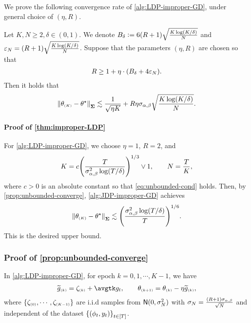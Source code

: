 We prove the following convergence rate of \cref{alg:LDP-improper-GD}, under general choice of $(\eta,R)$.
\begin{proposition}\label{prop:unbounded-converge}
Let $K,N\geq 2, \delta\in(0,1)$. We denote $B_\delta\mathrel{\mathop:}= 6(R+1)\sqrt{\frac{K\log(K/\delta)}{N}}$ and $\varepsilon_N=(R+1)\sqrt{\frac{K\log(K/\delta)}{N}}$. Suppose that the parameters $(\eta, R)$ are chosen so that
\begin{align}\label{eq:unbounded-cond}
    R\geq 1+\eta\cdot {\left(  B_\delta+4\varepsilon_N\right)}.
\end{align}
Then it holds that \whp
\begin{align*}
    \left\|\theta_{\scriptscriptstyle{ (K) }}-\theta^\star\right\|_{\boldsymbol{\Sigma}}\lesssim \frac{1}{\sqrt{\eta K}}+R\eta\sigma_{\alpha,\beta} \sqrt{\frac{K\log(K/\delta)}{N}}.
\end{align*}
\end{proposition}

\paragraph{Proof of \cref{thm:improper-LDP}}
For \cref{alg:LDP-improper-GD}, we choose $\eta=1$, $R=2$, and
\begin{align*}
    K=c{\left( \frac{T}{\sigma_{\alpha,\beta}^2 \log (T/\delta)} \right)}^{1/3}\vee 1, \qquad
    N=\frac{T}{K}, 
\end{align*}
where $c>0$ is an absolute constant so that \eqref{eq:unbounded-cond} holds. Then, by \cref{prop:unbounded-converge}, \cref{alg:JDP-improper-GD} achieves
\begin{align*}
    \left\|\theta_{\scriptscriptstyle{ (K) }}-\theta^\star\right\|_{\boldsymbol{\Sigma}}\lesssim {\left( \frac{\sigma_{\alpha,\beta}^2\log(T/\delta)}{T} \right)}^{1/6}.
\end{align*}
This is the desired upper bound.

\subsubsection{Proof of \cref{prop:unbounded-converge}}

In \cref{alg:LDP-improper-GD}, for epoch $k=0,1,\cdots,K-1$, we have
\begin{align*}
    \til g\kk=\zeta\kk+\avgtk g_t, \qquad
    \theta\kp=\theta\kk-\eta \til g\kk,
\end{align*}
where $\{\zeta_{\scriptscriptstyle{ (0) }},\cdots,\zeta_{\scriptscriptstyle{ (K-1) }}\}$ are i.i.d samples from $\mathsf{N}(0,\sigma_{N}^2)$ with $\sigma_{N}=\frac{(R+1)\sigma_{\alpha,\beta}}{\sqrt{N}}$ and independent of the dataset $\left\{(\phi_t,y_t)\right\}_{t\in[T]}$. 

